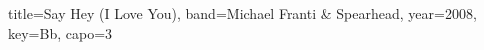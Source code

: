 \documentclass{skrul-leadsheet}
\begin{document}
\begin{song}[transpose-capo=true]{title={Say Hey (I Love You)}, band={Michael Franti \& Spearhead}, year={2008}, key={Bb}, capo={3}}



\end{song}
\end{document}
